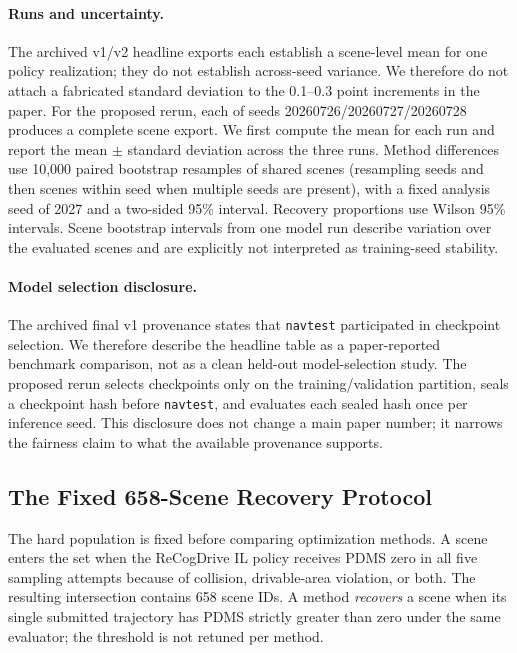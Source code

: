 \paragraph{Runs and uncertainty.}
The archived v1/v2 headline exports each establish a scene-level mean for one
policy realization; they do not establish across-seed variance.  We therefore
do not attach a fabricated standard deviation to the 0.1--0.3 point increments
in the paper.  For the proposed rerun, each of seeds
20260726/20260727/20260728 produces a
complete scene export.  We first compute the mean for each run and report the
mean $\pm$ standard deviation across the three runs.  Method differences use
10,000 paired bootstrap resamples of shared scenes (resampling seeds and then
scenes within seed when multiple seeds are present), with a fixed analysis seed
of 2027 and a two-sided 95\% interval.  Recovery proportions use Wilson 95\%
intervals.  Scene bootstrap intervals from one model run describe variation
over the evaluated scenes and are explicitly not interpreted as training-seed
stability.

\paragraph{Model selection disclosure.}
The archived final v1 provenance states that \texttt{navtest} participated in
checkpoint selection.  We therefore describe the headline table as a
paper-reported benchmark comparison, not as a clean held-out model-selection
study.  The proposed rerun selects checkpoints only on the training/validation
partition, seals a checkpoint hash before \texttt{navtest}, and evaluates each
sealed hash once per inference seed.  This disclosure does not change a main
paper number; it narrows the fairness claim to what the available provenance
supports.

\subsection{The Fixed 658-Scene Recovery Protocol}
\label{sec:hard658-protocol}

The hard population is fixed before comparing optimization methods.  A scene
enters the set when the ReCogDrive IL policy receives PDMS zero in all five
sampling attempts because of collision, drivable-area violation, or both.
The resulting intersection contains 658 scene IDs.  A method \emph{recovers} a
scene when its single submitted trajectory has PDMS strictly greater than
zero under the same evaluator; the threshold is not retuned per method.


